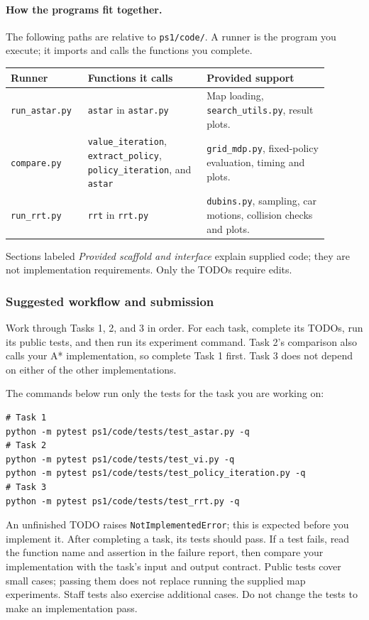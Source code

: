 \documentclass[11pt]{article}
\begin{document}
\paragraph{How the programs fit together.}
The following paths are relative to \texttt{ps1/code/}. A runner is the
program you execute; it imports and calls the functions you complete.
\begin{center}\small
\begin{tabular}{p{0.20\linewidth}p{0.34\linewidth}p{0.35\linewidth}}
\textbf{Runner} & \textbf{Functions it calls} & \textbf{Provided support} \\\hline
\texttt{run\_astar.py} & \texttt{astar} in \texttt{astar.py} &
Map loading, \texttt{search\_utils.py}, result plots. \\
\texttt{compare.py} & \texttt{value\_iteration}, \texttt{extract\_policy},
\texttt{policy\_iteration}, and \texttt{astar} &
\texttt{grid\_mdp.py}, fixed-policy evaluation, timing and plots. \\
\texttt{run\_rrt.py} & \texttt{rrt} in \texttt{rrt.py} &
\texttt{dubins.py}, sampling, car motions, collision checks and plots.
\end{tabular}
\end{center}
Sections labeled \emph{Provided scaffold and interface} explain supplied
code; they are not implementation requirements. Only the TODOs require edits.

\clearpage
\subsubsection*{Suggested workflow and submission}
Work through Tasks 1, 2, and 3 in order. For each task, complete its TODOs,
run its public tests, and then run its experiment command. Task 2's
comparison also calls your A* implementation, so complete Task 1 first.
Task 3 does not depend on either of the other implementations.

The commands below run only the tests for the task you are working on:
\begin{lstlisting}
# Task 1
python -m pytest ps1/code/tests/test_astar.py -q
# Task 2
python -m pytest ps1/code/tests/test_vi.py -q
python -m pytest ps1/code/tests/test_policy_iteration.py -q
# Task 3
python -m pytest ps1/code/tests/test_rrt.py -q
\end{lstlisting}
An unfinished TODO raises \texttt{NotImplementedError}; this is expected
before you implement it. After completing a task, its tests should pass.
If a test fails, read the function name and assertion in the failure
report, then compare your implementation with the task's input and output
contract. Public tests cover small cases; passing them does not replace
running the supplied map experiments. Staff tests also exercise additional
cases. Do not change the tests to make an implementation pass.
\end{document}

